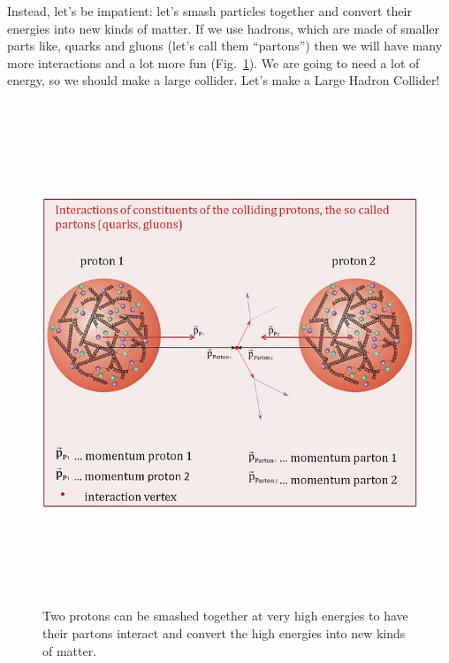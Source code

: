 Instead, let's be impatient: 
let's smash particles together and convert their energies into new kinds of matter. 
If we use hadrons, which are made of smaller parts like, quarks and gluons 
(let's call them ``partons'') then we will have many more interactions and a lot more fun (Fig.~\ref{fig:pp_collision}).
We are going to need a lot of energy, so we should make a large collider. 
Let's make a Large Hadron Collider!
\begin{figure}[pbth]
\centering
\includegraphics[width=15cm,height=15cm,keepaspectratio]{figures/lhc/proton_proton_quarksandgluons.jpg}
    \caption{
    Two protons can be smashed together at very high energies to have their partons interact and convert the high energies into new kinds of matter.} 
    \label{fig:pp_collision}
\end{figure}
